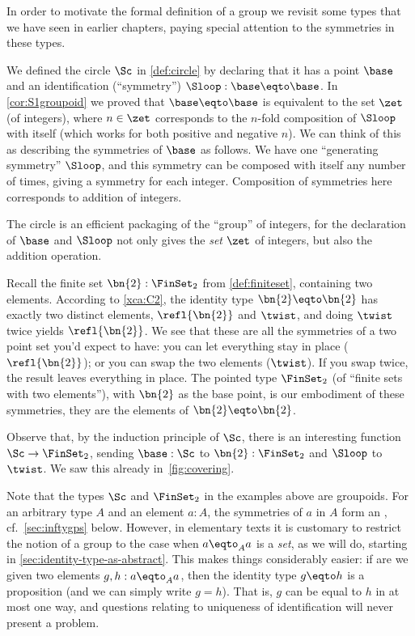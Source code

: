 In order to motivate the formal definition of a group we
revisit some types that we have seen in earlier chapters,
paying special attention to the symmetries in these types.
\begin{example}\label{ex:base=base}
  We defined the circle $\Sc$ in \cref{def:circle} by declaring
  that it has a point $\base$ and an identification (``symmetry'')
  $\Sloop:\base\eqto\base$.
  In \cref{cor:S1groupoid} we proved that $\base\eqto\base$ is equivalent
  to the set $\zet$ (of integers),
  where $n\in\zet$ corresponds to the $n$-fold composition of $\Sloop$ with itself
  (which works for both positive and negative $n$).
  We can think of this as describing the symmetries of $\base$ as follows.
  We have one ``generating symmetry'' $\Sloop$,
  and this symmetry can be composed with itself any number of times,
  giving a symmetry for each integer.
  Composition of symmetries here corresponds to addition of integers.

  The circle is an efficient packaging of the ``{group}'' of integers, 
  for the declaration of $\base$ and $\Sloop$ not only gives the \emph{set}
  $\zet$ of integers, but also the addition operation.
\end{example}
\begin{example}
  Recall the finite set $\bn{2}:\FinSet_2$ from \cref{def:finiteset},
  containing two elements.
  According to \cref{xca:C2}, the identity type $\bn{2} \eqto \bn{2}$ 
  has exactly two distinct elements, $\refl{\bn{2}}$ and $\twist$,
  and doing $\twist$ twice yields $\refl{\bn{2}}$.
  We see that these are all the symmetries
  of a two point set you'd expect to have:
  you can let everything stay in place ($\refl{\bn{2}}$);
  or you can swap the two elements ($\twist$).
  If you swap twice, the result leaves everything in place.
  The pointed type $\FinSet_2$ (of ``finite sets with two elements''),
  with $\bn{2}$ as the base point, is our embodiment of these symmetries, 
  \ie they are the elements of $\bn{2} \eqto \bn{2}$.

  Observe that, by the induction principle of $\Sc$,
  there is an interesting function $\Sc\to\FinSet_2$,
  sending $\base:\Sc$ to $\bn{2} :\FinSet_2$ and $\Sloop$ to $\twist$.
  We saw this already in~\cref{fig:covering}.
\end{example}

Note that the types $\Sc$ and $\FinSet_2$ in the examples above are groupoids.
For an arbitrary type $A$ and an element $a:A$,
the symmetries of $a$ in $A$ form an \inftygp, cf.~\cref{sec:inftygps} below.
However, in elementary texts it is customary to restrict the notion 
of a group to the case when $a\eqto_A a$ is a \emph{set}, 
as we will do, starting in \cref{sec:identity-type-as-abstract}.
This makes things considerably easier: if are we given two elements 
$g,h:a\eqto_A a$, then the identity type $g\eqto h$ is a proposition
(and we can simply write $g = h$). That is, $g$ can be equal to $h$ in 
at most one way, and questions relating to uniqueness of
identification will never present a problem.

